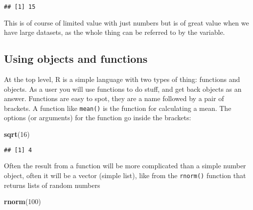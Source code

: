 \documentclass[
]{book}
\newenvironment{Shaded}{\begin{snugshade}}{\end{snugshade}}
\newcommand{\DecValTok}[1]{\textcolor[rgb]{0.00,0.00,0.81}{#1}}
\newcommand{\KeywordTok}[1]{\textcolor[rgb]{0.13,0.29,0.53}{\textbf{#1}}}
\newcommand{\NormalTok}[1]{#1}
\begin{document}
\begin{verbatim}
## [1] 15
\end{verbatim}

This is of course of limited value with just numbers but is of great value when we have large datasets, as the whole thing can be referred to by the variable.

\hypertarget{using-objects-and-functions}{%
\subsection{Using objects and functions}\label{using-objects-and-functions}}

At the top level, R is a simple language with two types of thing: functions and objects. As a user you will use functions to do stuff, and get back objects as an answer. Functions are easy to spot, they are a name followed by a pair of brackets. A function like \texttt{mean()} is the function for calculating a mean. The options (or arguments) for the function go inside the brackets:

\begin{Shaded}
\begin{Highlighting}[]
\KeywordTok{sqrt}\NormalTok{(}\DecValTok{16}\NormalTok{)}
\end{Highlighting}
\end{Shaded}

\begin{verbatim}
## [1] 4
\end{verbatim}

Often the result from a function will be more complicated than a simple number object, often it will be a vector (simple list), like from the \texttt{rnorm()} function that returns lists of random numbers

\begin{Shaded}
\begin{Highlighting}[]
\KeywordTok{rnorm}\NormalTok{(}\DecValTok{100}\NormalTok{)}
\end{Highlighting}
\end{Shaded}
\end{document}
